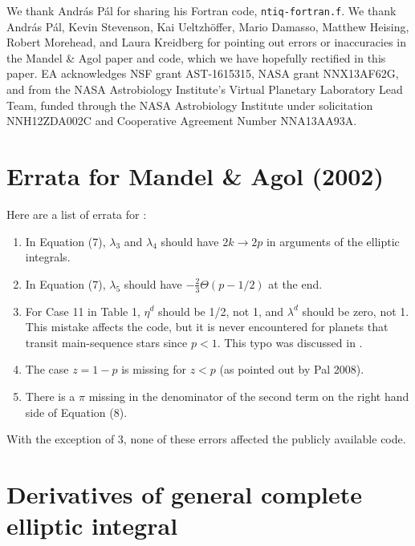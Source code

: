 \documentclass[modern]{aastex61}
\begin{document}
\acknowledgements

We thank Andr\'as P\'al for sharing his Fortran code, \texttt{ntiq-fortran.f}.
We thank Andr\'as P\'al, Kevin Stevenson, Kai Ueltzh\"offer, Mario Damasso,
Matthew Heising, Robert Morehead, and Laura Kreidberg for pointing out
errors or inaccuracies in the Mandel \& Agol paper and code, which we have
hopefully rectified in this paper.
EA acknowledges NSF grant AST-1615315, NASA grant NNX13AF62G, and from
the NASA Astrobiology Institute's Virtual Planetary Laboratory Lead Team,
funded through the NASA Astrobiology Institute under solicitation NNH12ZDA002C
and Cooperative Agreement Number NNA13AA93A.



\appendix

\section{Errata for Mandel \& Agol (2002)}

Here are a list of errata for \citet{MandelAgol2002}:
\begin{enumerate}
\item In Equation (7), $\lambda_3$ and $\lambda_4$ should have $2k \rightarrow
2p$ in arguments of the elliptic integrals.

\item In Equation (7), $\lambda_5$ should have $- \frac{2}{3}\Theta(p-1/2)$
at the end.

\item For Case 11 in Table 1, $\eta^d$ should be 1/2, not 1, and
$\lambda^d$ should be zero, not 1.  This mistake affects the code,
but it is never encountered for planets that transit main-sequence
stars since $p<1$.  This typo was discussed in \citet{Eastman2013}.

\item The case $z=1-p$ is missing for $z<p$ (as pointed out by
Pal 2008).

\item There is a $\pi$ missing in the denominator of the second term
on the right hand side of Equation (8).
\end{enumerate}

With the exception of 3, none of these errors affected the publicly
available code.

\section{Derivatives of general complete elliptic integral}
\label{app:cel_derivatives}
\end{document}

